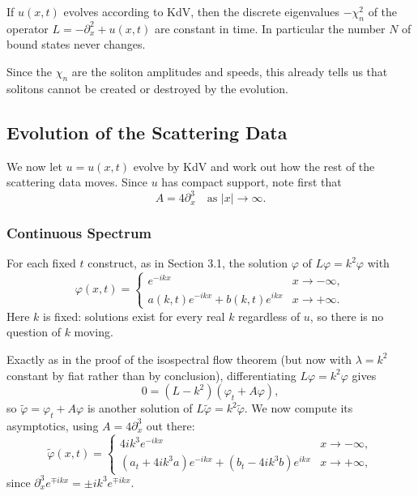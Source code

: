\documentclass[a4paper]{scrartcl}
\begin{document}
\begin{corollary}
	If $u(x,t)$ evolves according to KdV, then the discrete eigenvalues $-\chi_n^2$ of the operator $L = -\partial_x^2 + u(x,t)$ are constant in time. In particular the number $N$ of bound states never changes.
\end{corollary}

Since the $\chi_n$ are the soliton amplitudes and speeds, this already tells us that solitons cannot be created or destroyed by the evolution.

\subsection{Evolution of the Scattering Data}

We now let $u = u(x,t)$ evolve by KdV and work out how the rest of the scattering data moves. Since $u$ has compact support, note first that
$$
A = 4\partial_x^3 \quad\text{as } |x|\to\infty.
$$

\subsubsection{Continuous Spectrum}

For each fixed $t$ construct, as in Section 3.1, the solution $\varphi$ of $L\varphi = k^2\varphi$ with
$$
\varphi(x,t) = \begin{cases}e^{-ikx} & x\to-\infty,\\ a(k,t)e^{-ikx} + b(k,t)e^{ikx} & x\to+\infty.\end{cases}
$$
Here $k$ is fixed: solutions exist for every real $k$ regardless of $u$, so there is no question of $k$ moving.

Exactly as in the proof of the isospectral flow theorem (but now with $\lambda = k^2$ constant by fiat rather than by conclusion), differentiating $L\varphi = k^2\varphi$ gives
$$
0 = (L - k^2)\left(\varphi_t + A\varphi\right),
$$
so $\tilde\varphi = \varphi_t + A\varphi$ is another solution of $L\tilde\varphi = k^2\tilde\varphi$. We now compute its asymptotics, using $A = 4\partial_x^3$ out there:
$$
\tilde\varphi(x,t) = \begin{cases}
	4ik^3e^{-ikx} & x\to-\infty,\\
	\left(a_t + 4ik^3a\right)e^{-ikx} + \left(b_t - 4ik^3b\right)e^{ikx} & x\to+\infty,
\end{cases}
$$
since $\partial_x^3e^{\mp ikx} = \pm ik^3e^{\mp ikx}$.
\end{document}
